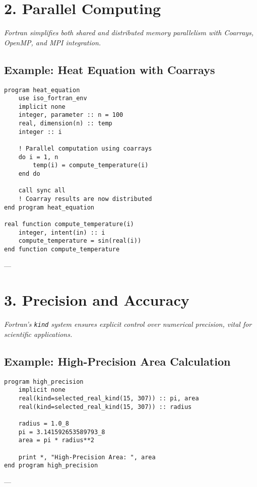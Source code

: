 \documentclass[a4paper,11pt]{article}
\begin{document}
\section{2. Parallel Computing}
\textit{Fortran simplifies both shared and distributed memory parallelism with Coarrays, OpenMP, and MPI integration.}

\subsection{Example: Heat Equation with Coarrays}
\begin{lstlisting}[caption={Heat Equation Simulation Using Coarrays}]
program heat_equation
    use iso_fortran_env
    implicit none
    integer, parameter :: n = 100
    real, dimension(n) :: temp
    integer :: i

    ! Parallel computation using coarrays
    do i = 1, n
        temp(i) = compute_temperature(i)
    end do

    call sync all
    ! Coarray results are now distributed
end program heat_equation

real function compute_temperature(i)
    integer, intent(in) :: i
    compute_temperature = sin(real(i))
end function compute_temperature
\end{lstlisting}

---

\section{3. Precision and Accuracy}
\textit{Fortran’s \texttt{kind} system ensures explicit control over numerical precision, vital for scientific applications.}

\subsection{Example: High-Precision Area Calculation}
\begin{lstlisting}[caption={High-Precision Example in Fortran}]
program high_precision
    implicit none
    real(kind=selected_real_kind(15, 307)) :: pi, area
    real(kind=selected_real_kind(15, 307)) :: radius

    radius = 1.0_8
    pi = 3.141592653589793_8
    area = pi * radius**2

    print *, "High-Precision Area: ", area
end program high_precision
\end{lstlisting}

---
\end{document}
